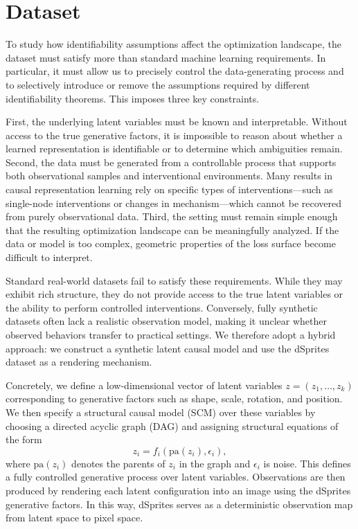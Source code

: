 \documentclass{article} %
\begin{document}
\section{Dataset}

To study how identifiability assumptions affect the optimization landscape, the dataset must satisfy more than standard machine learning requirements. In particular, it must allow us to precisely control the data-generating process and to selectively introduce or remove the assumptions required by different identifiability theorems. This imposes three key constraints.

First, the underlying latent variables must be known and interpretable. Without access to the true generative factors, it is impossible to reason about whether a learned representation is identifiable or to determine which ambiguities remain. Second, the data must be generated from a controllable process that supports both observational samples and interventional environments. Many results in causal representation learning rely on specific types of interventions—such as single-node interventions or changes in mechanism—which cannot be recovered from purely observational data. Third, the setting must remain simple enough that the resulting optimization landscape can be meaningfully analyzed. If the data or model is too complex, geometric properties of the loss surface become difficult to interpret.

Standard real-world datasets fail to satisfy these requirements. While they may exhibit rich structure, they do not provide access to the true latent variables or the ability to perform controlled interventions. Conversely, fully synthetic datasets often lack a realistic observation model, making it unclear whether observed behaviors transfer to practical settings. We therefore adopt a hybrid approach: we construct a synthetic latent causal model and use the dSprites dataset as a rendering mechanism.

Concretely, we define a low-dimensional vector of latent variables $z = (z_1, \dots, z_k)$ corresponding to generative factors such as shape, scale, rotation, and position. We then specify a structural causal model (SCM) over these variables by choosing a directed acyclic graph (DAG) and assigning structural equations of the form
\[
z_i = f_i(\mathrm{pa}(z_i), \epsilon_i),
\]
where $\mathrm{pa}(z_i)$ denotes the parents of $z_i$ in the graph and $\epsilon_i$ is noise. This defines a fully controlled generative process over latent variables. Observations are then produced by rendering each latent configuration into an image using the dSprites generative factors. In this way, dSprites serves as a deterministic observation map from latent space to pixel space.
\end{document}
